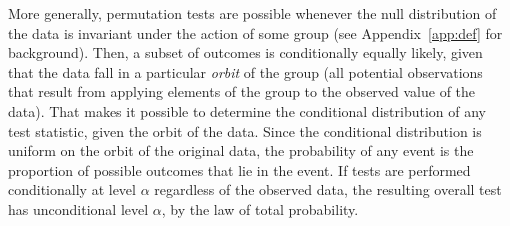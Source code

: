 More generally, permutation tests are possible whenever the
null distribution of the data is invariant under the action of some group (see Appendix~\ref{app:def} for background).
Then, a subset of outcomes is conditionally equally likely, given that the data
fall in a particular \emph{orbit} of the group (all potential observations that result from
applying elements of the group to the observed value of the data).
That makes it possible to
determine the conditional distribution of any test statistic, given the orbit
of the data.
Since the conditional distribution is uniform on the orbit of the
original data, the probability of any event is the proportion of possible
outcomes that lie in the event.
If tests are performed conditionally at level $\alpha$ regardless
of the observed data, the resulting overall test has unconditional level
$\alpha$, by the law of total probability.


